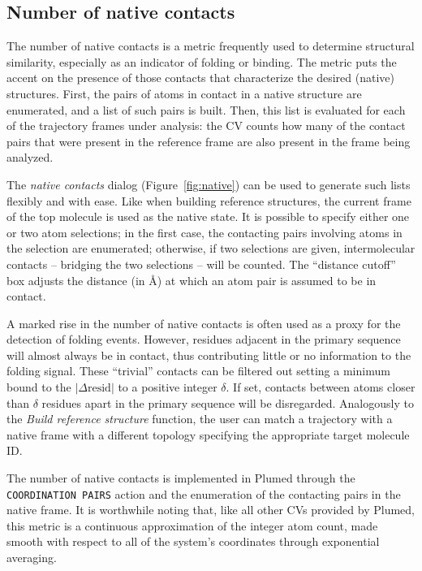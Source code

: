 \documentclass[preprint,12pt]{elsarticle}
\begin{document}
\subsection{Number of native contacts}

The number of native contacts is a metric  frequently used to
determine structural similarity, especially as an indicator of folding
or binding.  The metric puts the accent on the presence of those
contacts that characterize the desired (native) structures. First, the
pairs of atoms in contact in a native structure are
enumerated, and a list of such pairs is built. Then, this list is evaluated
for each of the trajectory frames under analysis: the 
CV counts how many of the contact pairs that were present in the
reference frame are also present in the frame being analyzed.  

The \emph{native contacts} dialog (Figure~\ref{fig:native}) can be
used to generate such lists flexibly and with ease. Like when building
reference structures, the current frame of the top molecule is used as
the native state.  It is possible to specify either one or two atom
selections; in the first case, the contacting pairs involving atoms in
the selection are enumerated; otherwise, if two selections are given,
intermolecular contacts -- bridging the two selections -- will be
counted.  The ``distance cutoff'' box adjusts the distance (in \AA) at
which an atom pair is assumed to be in contact.

A marked rise in the number of native contacts is often used as a
proxy for the detection of folding events. However, residues adjacent
in the primary sequence will almost always be in contact, thus
contributing little or no information to the folding signal. These
``trivial'' contacts can be filtered out setting a minimum bound to
the $| \Delta \mbox{resid} |$ to a positive integer $\delta$. If set,
contacts between atoms closer than $\delta$ residues apart in the
primary sequence will be disregarded.
Analogously to the \emph{Build reference structure} function, the user
can match a trajectory with a native frame with a different topology
specifying the appropriate target molecule ID.

The number of native contacts is implemented in Plumed through the
\texttt{COORDINATION PAIRS} action and the enumeration of the
contacting pairs in the native frame.  It is worthwhile noting that,
like all other CVs provided by Plumed, this metric is a continuous
approximation of the integer atom count, made smooth with respect to
all of the system's coordinates through exponential averaging.
\end{document}
